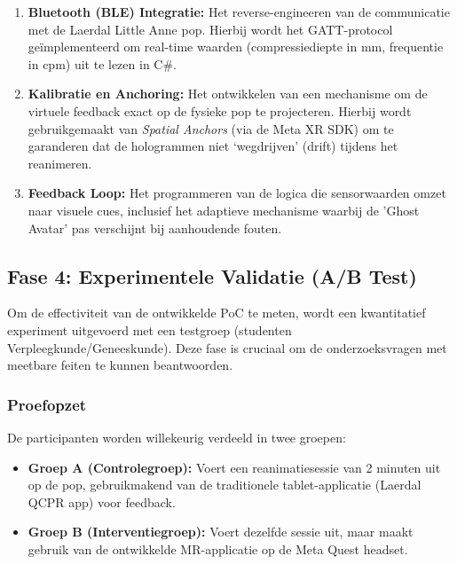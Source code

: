 \begin{enumerate}
    \item \textbf{Bluetooth (BLE) Integratie:} Het reverse-engineeren van de communicatie met de Laerdal Little Anne pop. Hierbij wordt het GATT-protocol geïmplementeerd om real-time waarden (compressiediepte in mm, frequentie in cpm) uit te lezen in C\#.
    \item \textbf{Kalibratie en Anchoring:} Het ontwikkelen van een mechanisme om de virtuele feedback exact op de fysieke pop te projecteren. Hierbij wordt gebruikgemaakt van \textit{Spatial Anchors} (via de Meta XR SDK) om te garanderen dat de hologrammen niet `wegdrijven' (drift) tijdens het reanimeren.
    \item \textbf{Feedback Loop:} Het programmeren van de logica die sensorwaarden omzet naar visuele cues, 
    inclusief het adaptieve mechanisme waarbij de 'Ghost Avatar' pas verschijnt bij aanhoudende fouten.
\end{enumerate}

\subsection{Fase 4: Experimentele Validatie (A/B Test)}
Om de effectiviteit van de ontwikkelde PoC te meten, wordt een kwantitatief experiment uitgevoerd met een testgroep (studenten Verpleegkunde/Geneeskunde). 
Deze fase is cruciaal om de onderzoeksvragen met meetbare feiten te kunnen beantwoorden.

\subsubsection{Proefopzet}
De participanten worden willekeurig verdeeld in twee groepen:
\begin{itemize}
    \item \textbf{Groep A (Controlegroep):} Voert een reanimatiesessie van 2 minuten uit op de pop, gebruikmakend van de traditionele tablet-applicatie (Laerdal QCPR app) voor feedback.
    \item \textbf{Groep B (Interventiegroep):} Voert dezelfde sessie uit, maar maakt gebruik van de ontwikkelde MR-applicatie op de Meta Quest headset.
\end{itemize}

